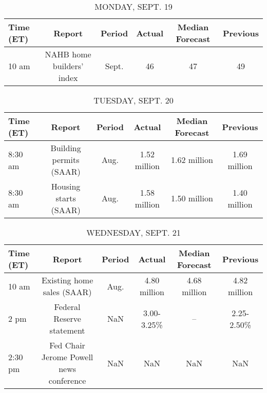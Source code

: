 \documentclass{article}%
\begin{document}
%
\normalsize%


\begin{table}[htbp]%
\caption{MONDAY, SEPT. 19}%
\centering%
\begin{adjustbox}{width=1\textwidth}%
\begin{tabular}{lccccc}
\toprule
Time (ET) &                    Report & Period & Actual & Median Forecast & Previous \\
\midrule
    10 am & NAHB home builders' index &  Sept. &     46 &              47 &       49 \\
\bottomrule
\end{tabular}
%
\end{adjustbox}%
\end{table}

%


\begin{table}[htbp]%
\caption{TUESDAY, SEPT. 20}%
\centering%
\begin{adjustbox}{width=1\textwidth}%
\begin{tabular}{lccccc}
\toprule
Time (ET) &                  Report & Period &       Actual & Median Forecast &     Previous \\
\midrule
  8:30 am & Building permits (SAAR) &   Aug. & 1.52 million &    1.62 million & 1.69 million \\
  8:30 am &   Housing starts (SAAR) &   Aug. & 1.58 million &    1.50 million & 1.40 million \\
\bottomrule
\end{tabular}
%
\end{adjustbox}%
\end{table}

%


\begin{table}[htbp]%
\caption{WEDNESDAY, SEPT. 21}%
\centering%
\begin{adjustbox}{width=1\textwidth}%
\begin{tabular}{lccccc}
\toprule
Time (ET) &                                  Report & Period &       Actual & Median Forecast &     Previous \\
\midrule
    10 am &              Existing home sales (SAAR) &   Aug. & 4.80 million &    4.68 million & 4.82 million \\
     2 pm &               Federal Reserve statement &    NaN &   3.00-3.25\% &              -- &   2.25-2.50\% \\
  2:30 pm & Fed Chair Jerome Powell news conference &    NaN &          NaN &             NaN &          NaN \\
\bottomrule
\end{tabular}
%
\end{adjustbox}%
\end{table}
\end{document}
